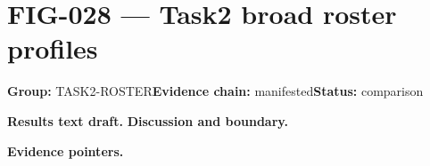 \clearpage
\section{FIG-028 --- Task2 broad roster profiles}
\label{figpage:fig-028}
\textbf{Group:} TASK2-ROSTER\quad \textbf{Evidence chain:} manifested\quad \textbf{Status:} comparison

\textbf{Results text draft.} 
\textbf{Discussion and boundary.} 


\textbf{Evidence pointers.}



\vfill
